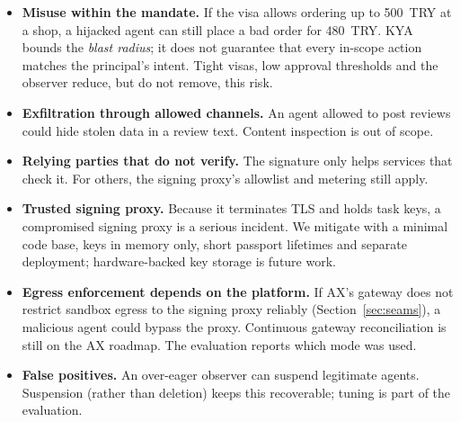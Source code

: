 \begin{itemize}
  \item \textbf{Misuse within the mandate.} If the visa allows ordering up to 500~TRY at a shop, a hijacked agent can still place a bad order for 480~TRY. KYA bounds the \emph{blast radius}; it does not guarantee that every in-scope action matches the principal's intent. Tight visas, low approval thresholds and the observer reduce, but do not remove, this risk.
  \item \textbf{Exfiltration through allowed channels.} An agent allowed to post reviews could hide stolen data in a review text. Content inspection is out of scope.
  \item \textbf{Relying parties that do not verify.} The signature only helps services that check it. For others, the signing proxy's allowlist and metering still apply.
  \item \textbf{Trusted signing proxy.} Because it terminates TLS and holds task keys, a compromised signing proxy is a serious incident. We mitigate with a minimal code base, keys in memory only, short passport lifetimes and separate deployment; hardware-backed key storage is future work.
  \item \textbf{Egress enforcement depends on the platform.} If AX's gateway does not restrict sandbox egress to the signing proxy reliably (Section~\ref{sec:seams}), a malicious agent could bypass the proxy. Continuous gateway reconciliation is still on the AX roadmap. The evaluation reports which mode was used.
  \item \textbf{False positives.} An over-eager observer can suspend legitimate agents. Suspension (rather than deletion) keeps this recoverable; tuning is part of the evaluation.
\end{itemize}

